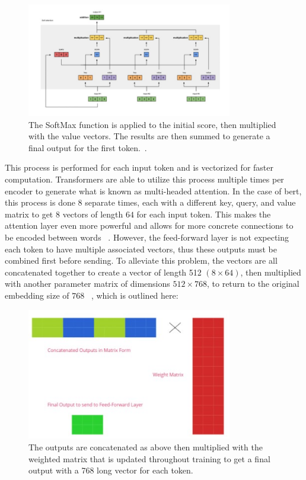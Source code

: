 \documentclass[12pt]{article}
\begin{document}
\begin{figure}[H]
\centering
\includegraphics[width=0.8\textwidth]{fig/second_encoder_step.jpg}
\caption{The SoftMax function is applied to the initial score, then multiplied with the value vectors. The results are then summed to generate a final output for the first token.~\parencite{karim_2019}.
}
\label{fig:second_encoder_step}
\end{figure}

This process is performed for each input token and is vectorized for faster computation. Transformers are able to utilize this process multiple times per encoder to generate what is known as multi-headed attention. In the case of \acrshort{bert}, this process is done $8$ separate times, each with a different key, query, and value matrix to get $8$ vectors of length $64$ for each input token. This makes the attention layer even more powerful and allows for more concrete connections to be encoded between words ~\parencite{transformers:}. However, the feed-forward layer is not expecting each token to have multiple associated vectors, thus these outputs must be combined first before sending. To alleviate this problem, the vectors are all concatenated together to create a vector of length 512 $(8 \times 64)$, then multiplied with another parameter matrix of dimensions $512 \times 768$, to return to the original embedding size of $768$ ~\parencite{devlin2019bert:}, which is outlined here:

\begin{figure}[H]
\centering
\includegraphics[width=0.8\textwidth]{fig/multi-head.jpg}
\caption{The outputs are concatenated as above then multiplied with the weighted matrix that is updated throughout training to get a final output with a 768 long vector for each token.
}
\label{fig:multi_head_attention}
\end{figure}
\end{document}
